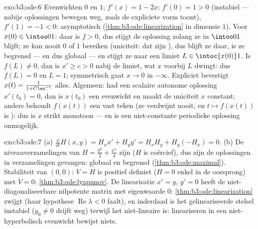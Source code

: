 \begin{solution}{exo:b3:ode:6}
Evenwichten $0$ en $1$; $f'(x) = 1 - 2x$: $f'(0) = 1 > 0$
(instabiel --- nabije oplossingen bewegen weg, zoals de
expliciete vorm toont), $f'(1) = -1 < 0$: asymptotisch 
(\cref{thm:b3:ode:linearization} in dimensie $1$). Voor $x(0)
\in \intoo01$: daar is $f > 0$, dus stijgt de oplossing zolang ze
in $\intoo01$ blijft; ze kan nooit $0$ of $1$ bereiken
(uniciteit: dat zijn ), dus blijft ze daar, is ze begrensd
--- en dus globaal --- en stijgt ze naar een limiet $L \in
\intoc{x(0)}1$. Is $f(L) \neq 0$, dan is $x' \geq c > 0$ nabij de
limiet, wat $x$ voorbij $L$ dwingt: dus $f(L) = 0$ en $L = 1$;
symmetrisch gaat $x \to 0$ in $-\infty$. Expliciet bevestigt
$x(t) = \frac1{1 + C\eu^{-t}}$ alles. Algemeen: had een scalaire
autonome oplossing $x'(t_0) = 0$, dan is $x(t_0)$ een evenwicht
en maakt de uniciteit $x$ constant; anders behoudt $f(x(t))$ een
vast teken (ze verdwijnt nooit, en $t \mapsto f(x(t))$ is
): dus is $x$ strikt monotoon --- en is een niet-constante
periodieke oplossing onmogelijk.
\end{solution}

\begin{solution}{exo:b3:ode:7}
(a) $\frac{\dd}{\dd t}H(x,y) = H_xx' + H_yy' = H_xH_y +
H_y(-H_x) = 0$.
(b) De niveauverzamelingen van $H = \frac{y^2}2 + \frac{x^4}4$
zijn  ($H$ is coërcief), dus zijn de oplossingen in
 verzamelingen gevangen: globaal en begrensd
(\cref{thm:b3:ode:maximal}). Stabiliteit van $(0,0)$: $V = H$ is
positief definiet ($H = 0$ enkel in de oorsprong) met $\dot V =
0$: \cref{thm:b3:ode:lyapunov}. De linearisatie $x' = y$, $y' =
0$ heeft de niet-diagonaliseerbare nilpotente matrix met
eigenwaarde $0$: \cref{thm:b3:ode:linearization} zwijgt (haar
hypothese $\operatorname{Re}\lambda < 0$ faalt), en inderdaad is
het gelineariseerde stelsel instabiel ($y_0 \ne 0$ drijft weg)
terwijl het niet-lineaire  is: lineariseren in een
niet-hyperbolisch evenwicht bewijst niets.
\end{solution}


